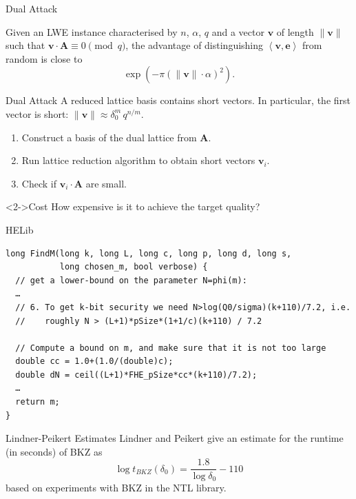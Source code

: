 \documentclass[presentation,smaller]{beamer}
\renewcommand{\vec}[1]{\ensuremath{\mathbf{#1}}\xspace}
\newcommand{\ip}[2]{\ensuremath{\left\langle {#1},{#2}\right\rangle}\xspace}
\begin{document}
\begin{frame}[label={sec:orgheadline13}]{Dual Attack}
\begin{lemma}
Given an LWE instance characterised by \(n\), \(α\), \(q\) and a vector \(\vec{v}\) of length \(\|\vec{v}\|\) such that \(\vec{v} ⋅ \vec{A} \equiv 0 \pmod{q}\), the advantage of distinguishing \(\ip{\vec{v}}{\vec{e}}\) from random is close to  \[\exp(-π(\|\vec{v}\| ⋅ α)^2).\]
\end{lemma}
\end{frame}

\begin{frame}[label={sec:orgheadline14}]{Dual Attack}
A \alert{reduced lattice} basis contains short vectors. In particular, the first vector is short: \(\|\vec{v}\| ≈ δ_0^m\, q^{n/m}\).

\begin{enumerate}
\item Construct a basis of the dual lattice from \(\vec{A}\).
\item Run lattice reduction algorithm to obtain short vectors \(\vec{v}_i\).
\item Check if \(\vec{v}_i⋅ \vec{A}\) are small.
\end{enumerate}

\begin{block}<2->{Cost}
How expensive is it to achieve the target quality?
\end{block}
\end{frame}

\begin{frame}[fragile,label={sec:orgheadline15}]{HELib}
 \lstset{language=C++,label= ,caption= ,captionpos=b,numbers=none}
\begin{lstlisting}
long FindM(long k, long L, long c, long p, long d, long s,
           long chosen_m, bool verbose) {
  // get a lower-bound on the parameter N=phi(m):
  …
  // 6. To get k-bit security we need N>log(Q0/sigma)(k+110)/7.2, i.e.
  //    roughly N > (L+1)*pSize*(1+1/c)(k+110) / 7.2

  // Compute a bound on m, and make sure that it is not too large
  double cc = 1.0+(1.0/(double)c);
  double dN = ceil((L+1)*FHE_pSize*cc*(k+110)/7.2);
  …
  return m;
}
\end{lstlisting}
\end{frame}

\begin{frame}[label={sec:orgheadline16}]{Lindner-Peikert Estimates}
Lindner and Peikert  give an estimate for the runtime (in seconds) of BKZ as \[\log{t_{BKZ}(δ_0)} = \frac{1.8}{\log{δ_0}}-110\] based on experiments with BKZ in the NTL library.
\end{frame}
\end{document}
